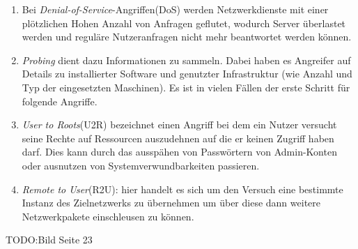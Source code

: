\begin{enumerate}
\item Bei \textit{Denial-of-Service}-Angriffen(DoS) werden Netzwerkdienste mit einer plötzlichen Hohen Anzahl von Anfragen geflutet, wodurch Server überlastet werden und reguläre Nutzeranfragen nicht mehr beantwortet werden können.
\item \textit{Probing} dient dazu Informationen zu sammeln. Dabei haben es Angreifer auf Details zu installierter Software und genutzter Infrastruktur (wie Anzahl und Typ der eingesetzten Maschinen). Es ist in vielen Fällen der erste Schritt für folgende Angriffe.
\item \textit{User to Roots}(U2R) bezeichnet einen Angriff bei dem ein Nutzer versucht seine Rechte auf Ressourcen auszudehnen auf die er keinen Zugriff haben darf. Dies kann durch das ausspähen von Passwörtern von Admin-Konten oder ausnutzen von Systemverwundbarkeiten passieren.
\item \textit{Remote to User}(R2U): hier handelt es sich um den Versuch eine bestimmte Instanz des Zielnetzwerks zu übernehmen um über diese dann weitere Netzwerkpakete einschleusen zu können.
\end{enumerate}
TODO:Bild Seite 23

